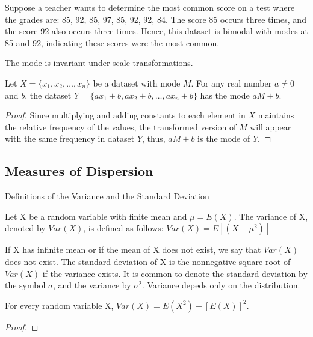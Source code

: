 \begin{example}
Suppose a teacher wants to determine the most common score on a test where the grades are: 85, 92, 85, 97, 85, 92, 92, 84. The score 85 occurs three times, and the score 92 also occurs three times. Hence, this dataset is bimodal with modes at 85 and 92, indicating these scores were the most common.
\end{example}

The mode is invariant under scale transformations.

\begin{proposition}
Let \( X = \{x_1, x_2, \dots, x_n\} \) be a dataset with mode \( M \). For any real number \( a \neq 0 \) and \( b \), the dataset \( Y = \{a x_1 + b, a x_2 + b, \dots, a x_n + b\} \) has the mode \( aM + b \).
\end{proposition}
\begin{proof}
Since multiplying and adding constants to each element in \( X \) maintains the relative frequency of the values, the transformed version of \( M \) will appear with the same frequency in dataset \( Y \), thus, \( aM + b \) is the mode of \( Y \).
\end{proof}

%
%
\subsection{Measures of Dispersion}

Definitions of the Variance and the Standard Deviation

\begin{definition}
Let X be a random variable with finite mean and $\mu=E\left(X\right)$. The variance of X, denoted by $Var\left(X\right)$, is defined as follows: $Var\left(X\right)=E\left[\left(X-\mu^{2}\right)\right]$
\end{definition}

{\color{red} If X has infinite mean or if the mean of X does not exist, we say that $Var\left(X\right)$ does not exist. The standard deviation of X is the nonnegative square root of $Var\left(X\right)$ if the variance exists. It is common to denote the standard deviation by the symbol $\sigma$, and the variance by $\sigma^{2}$. Variance depeds only on the distribution.}

\begin{proposition}
For every random variable X, $Var\left(X\right)=E\left(X^{2}\right)-\left[E\left(X\right)\right]^{2}$.
\end{proposition}
\begin{proof}
\end{proof}

